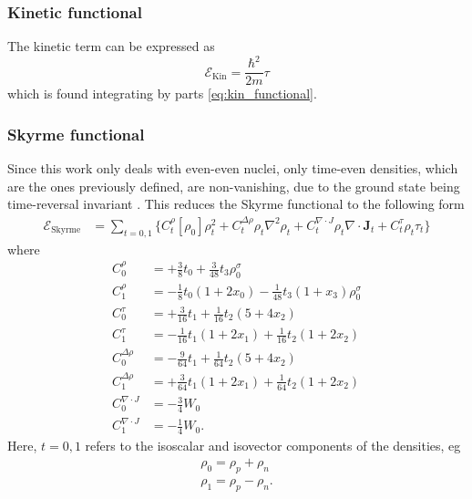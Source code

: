 \subsubsection{Kinetic functional}
The kinetic term can be expressed as
\begin{equation}
    \label{eq:kinfunc}
    \mathcal E_\text{Kin} = \frac{\hbar^2}{2m}\tau
\end{equation}
which is found integrating by parts \eqref{eq:kin_functional}.
\subsubsection{Skyrme functional}
Since this work only deals with even-even nuclei, only time-even densities, which are the ones previously defined, are non-vanishing, due to the ground state being time-reversal invariant \cite{Bender2003}. This reduces the Skyrme functional to the following form \cite{stevenson2019low}
\begin{align}
    \mathcal E_\text{Skyrme} &= \sum_{t=0,1}\bigg\{C_t^\rho [\rho_0]\rho_t^2+C_t^{\Delta \rho}\rho_t\nabla^2\rho_t+C_t^{\nabla\cdot J}\rho_t\nabla\cdot \mathbf J_t + C_t^\tau\rho_t\tau_t\bigg\}\label{eq:skfunc}
\end{align}
where
\begin{align}
    C_0^\rho &= +\frac 3 8 t_0 + \frac 3 {48} t_3\rho_0^\sigma \label{eq:C0rho}
    \\C_1^\rho &= -\frac 1 8 t_0(1+2x_0)- \frac 1 {48} t_3(1+x_3)\rho_0^\sigma \label{eq:C1rho}
    \\C_0^\tau &= +\frac 3 {16} t_1 + \frac 1 {16} t_2 (5+4x_2) \label{eq:C0tau}
    \\C_1^\tau &= -\frac 1 {16} t_1(1+2x_1)+\frac 1 {16}t_2(1+2x_2) \label{eq:C1tau}
    \\C_0^{\Delta \rho} &= -\frac 9 {64}t_1+\frac 1 {64}t_2(5+4x_2) \label{eq:C0Deltarho}
    \\C_1^{\Delta \rho} &= +\frac 3 {64}t_1(1+2x_1)+\frac 1 {64}t_2(1+2x_2) \label{eq:C1Deltarho}
    \\C_0^{\nabla\cdot J} &= -\frac 3 4 W_0 \label{eq:C0nabladotJ}
    \\C_1^{\nabla\cdot J} &= -\frac 1 4 W_0 \label{eq:C1nabladotJ}.
\end{align}
Here, $t=0,1$ refers to the isoscalar and isovector components of the densities, eg
\begin{align*}
    \rho_0 = \rho_p + \rho_n
    \\\rho_1 = \rho_p - \rho_n.
\end{align*}
